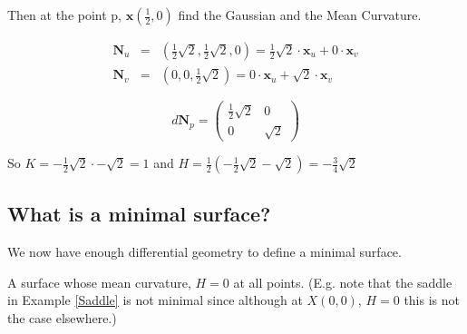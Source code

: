 \begin{example}
Then at the point p, $\mathbf x(\frac{1}{2},0)$ find the Gaussian and the Mean Curvature.

\begin{eqnarray}
\nonumber
\mathbf N_u &=& (\frac{1}{2}\sqrt{2},\frac{1}{2}\sqrt{2},0) = \frac{1}{2}\sqrt{2} \cdot \mathbf x_u + 0 \cdot \mathbf x_v \\
\nonumber
\mathbf N_v &=& (0,0,\frac{1}{2}\sqrt{2}) = 0 \cdot \mathbf x_u + \sqrt{2} \cdot \mathbf x_v
\end{eqnarray}

\begin{displaymath}
d\mathbf N_p =
\left( \begin{array}{cc}
\frac{1}{2}\sqrt{2} & 0 \\
0 & \sqrt{2}
\end{array} \right)
\end{displaymath}

So $ K = -\frac{1}{2}\sqrt{2} \cdot -\sqrt{2} = 1 $ and $H = \frac{1}{2}(-\frac{1}{2}\sqrt{2} - \sqrt{2}) = -\frac{3}{4}\sqrt{2}$

\end{example}

\subsection{What is a minimal surface?}
We now have enough differential geometry to define a minimal surface.

\begin{definition}
A surface whose mean curvature, $H=0$ at all points. (E.g. note that the saddle in Example \ref{Saddle} is not minimal since although at $X(0,0)$, $H=0$ this is not the case elsewhere.)
\end{definition}
